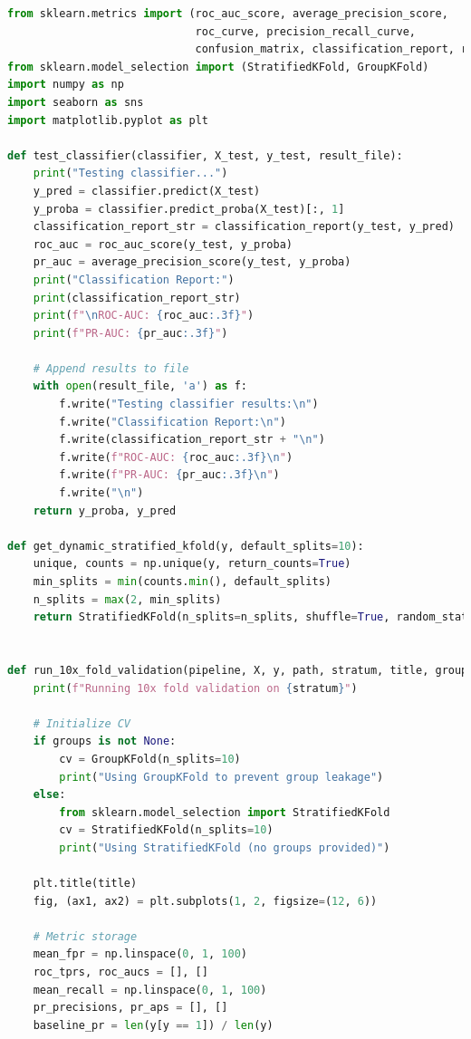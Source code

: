 \documentclass[12pt]{report}
\begin{document}
    \begin{lstlisting}[language=Python,caption={common\_ml.py: Κοινές συναρτήσεις για test, cross-validation, κατασκευή plot}, label=lst:commonml]
from sklearn.metrics import (roc_auc_score, average_precision_score,
                             roc_curve, precision_recall_curve,
                             confusion_matrix, classification_report, roc_curve, auc, precision_recall_curve)
from sklearn.model_selection import (StratifiedKFold, GroupKFold)
import numpy as np
import seaborn as sns
import matplotlib.pyplot as plt

def test_classifier(classifier, X_test, y_test, result_file):
    print("Testing classifier...")
    y_pred = classifier.predict(X_test)
    y_proba = classifier.predict_proba(X_test)[:, 1]
    classification_report_str = classification_report(y_test, y_pred)
    roc_auc = roc_auc_score(y_test, y_proba)
    pr_auc = average_precision_score(y_test, y_proba)
    print("Classification Report:")
    print(classification_report_str)
    print(f"\nROC-AUC: {roc_auc:.3f}")
    print(f"PR-AUC: {pr_auc:.3f}")

    # Append results to file
    with open(result_file, 'a') as f:
        f.write("Testing classifier results:\n")
        f.write("Classification Report:\n")
        f.write(classification_report_str + "\n")
        f.write(f"ROC-AUC: {roc_auc:.3f}\n")
        f.write(f"PR-AUC: {pr_auc:.3f}\n")
        f.write("\n")
    return y_proba, y_pred

def get_dynamic_stratified_kfold(y, default_splits=10):
    unique, counts = np.unique(y, return_counts=True)
    min_splits = min(counts.min(), default_splits)
    n_splits = max(2, min_splits)
    return StratifiedKFold(n_splits=n_splits, shuffle=True, random_state=42)


def run_10x_fold_validation(pipeline, X, y, path, stratum, title, groups=None):
    print(f"Running 10x fold validation on {stratum}")

    # Initialize CV
    if groups is not None:
        cv = GroupKFold(n_splits=10)
        print("Using GroupKFold to prevent group leakage")
    else:
        from sklearn.model_selection import StratifiedKFold
        cv = StratifiedKFold(n_splits=10)
        print("Using StratifiedKFold (no groups provided)")

    plt.title(title)
    fig, (ax1, ax2) = plt.subplots(1, 2, figsize=(12, 6))

    # Metric storage
    mean_fpr = np.linspace(0, 1, 100)
    roc_tprs, roc_aucs = [], []
    mean_recall = np.linspace(0, 1, 100)
    pr_precisions, pr_aps = [], []
    baseline_pr = len(y[y == 1]) / len(y)


\end{lstlisting}
\end{document}
